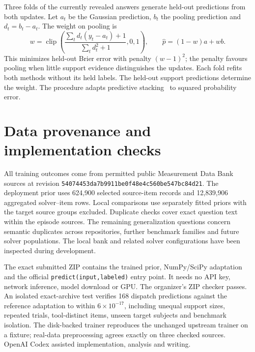 \documentclass{article}
\begin{document}
Three folds of the currently revealed answers generate held-out predictions from both updates. Let $a_t$ be the Gaussian prediction, $b_t$ the pooling prediction and $d_t=b_t-a_t$. The weight on pooling is
\begin{equation}
w=\operatorname{clip}\!\left(\frac{\sum_t d_t(y_t-a_t)+1}{\sum_t d_t^2+1},0,1\right),\qquad
\widehat p=(1-w)a+wb.
\end{equation}
This minimizes held-out Brier error with penalty $(w-1)^2$; the penalty favours pooling when little support evidence distinguishes the updates. Each fold refits both methods without its held labels. The held-out support predictions determine the weight. The procedure adapts predictive stacking~\cite{stacking} to squared probability error.




\section{Data provenance and implementation checks}
All training outcomes come from permitted public Measurement Data Bank sources at revision \texttt{54074453da7b9911be0f48e4c560be547bc84d21}. The deployment prior uses 624,900 selected source-item records and 12,839,906 aggregated solver--item rows. Local comparisons use separately fitted priors with the target source groups excluded. Duplicate checks cover exact question text within the episode sources. The remaining generalization questions concern semantic duplicates across repositories, further benchmark families and future solver populations. The local bank and related solver configurations have been inspected during development.

The exact submitted ZIP contains the trained prior, NumPy/SciPy adaptation and the official \texttt{predict(input,labeled)} entry point. It needs no API key, network inference, model download or GPU. The organizer's ZIP checker passes. An isolated exact-archive test verifies 168 dispatch predictions against the reference adaptation to within $6\times10^{-17}$, including unequal support sizes, repeated trials, tool-distinct items, unseen target subjects and benchmark isolation. The disk-backed trainer reproduces the unchanged upstream trainer on a fixture; real-data preprocessing agrees exactly on three checked sources. OpenAI Codex assisted implementation, analysis and writing.


\clearpage
\end{document}
